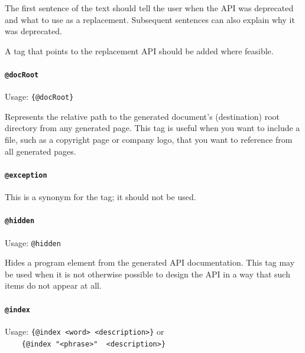 The first sentence of the text should tell the user when the API was deprecated and what to use as a replacement. Subsequent sentences can also explain why it was deprecated.

A  tag that points to the replacement API should be added where feasible.



\paragraph{\lstinline|@docRoot|}\label{sec:TagDocRoot}  Usage: \lstinline|{@docRoot}|

Represents the relative path to the generated document's (destination) root directory from any generated page. This tag is useful when you want to include a file, such as a copyright page or company logo, that you want to reference from all generated pages.


\paragraph{\lstinline|@exception|} This is a synonym for the  tag; it should not be used.


\paragraph{\lstinline|@hidden|}\label{sec:TagHidden}  Usage: \lstinline|@hidden|

Hides a program element from the generated API documentation. This tag may be used when it is not otherwise possible to design the API in a way that such items do not appear at all.


\paragraph{\lstinline|@index|}\label{sec:TagIndex}  Usage: \lstinline|{@index <word> <description>}| or\\  
\lstinline|    {@index "<phrase>"  <description>}|

